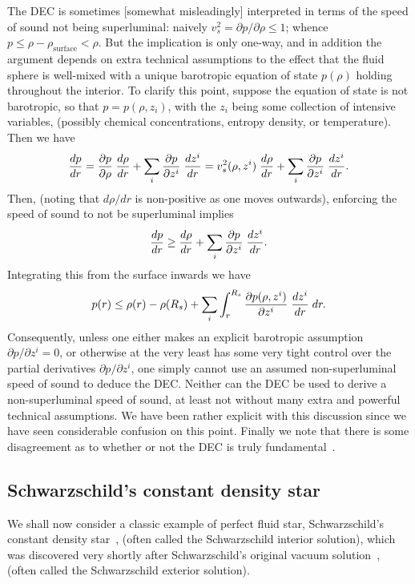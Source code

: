 \documentclass[12pt]{article}
\begin{document}
The DEC is sometimes [somewhat misleadingly] interpreted in terms of the speed of sound not being superluminal: naively $v_s^2 = \partial p/\partial \rho \leq 1$; whence $p\leq \rho-\rho_\mathrm{surface} <\rho$. 
But the implication is only one-way, and in addition the argument depends on extra technical assumptions to the effect that the fluid sphere is well-mixed with a unique barotropic equation of state $p(\rho)$ holding throughout the interior. To clarify this point, suppose the equation of state is not barotropic, so that $p=p(\rho, z_i)$, with the $z_i$ being some collection of intensive variables,  (possibly chemical concentrations, entropy density, or temperature). Then we have
\begin{equation}
{dp \over dr } = {\partial p\over\partial\rho}\; {d\rho\over dr} + 
\sum_i {\partial p\over\partial z^i} \;{d z^i\over dr}
=
v_s^2(\rho,z^i)\; {d\rho\over dr} + 
\sum_i {\partial p\over\partial z^i} \;{d z^i\over dr}. 
\end{equation}
Then, (noting that $d\rho/dr$ is non-positive as one moves outwards), enforcing the speed of sound to not be superluminal implies
\begin{equation}
{dp \over dr } \geq {d\rho\over dr} + 
\sum_i {\partial p\over\partial z^i} \;{d z^i\over dr}. 
\end{equation}
Integrating this from the surface inwards we have
\begin{equation}
p(r) \leq \rho(r) - \rho(R_s)+ 
\sum_i  \int_r^{R_s} {\partial p(\rho,z^i)\over\partial z^i} \;{d z^i\over dr} \;dr.
\end{equation}
Consequently, unless one either makes an explicit barotropic assumption $\partial p/\partial z^i=0$, or otherwise at the very least has some very tight control over the partial derivatives $\partial p/\partial z^i$,
one simply cannot use an assumed non-superluminal speed of sound to deduce the DEC. 
Neither can the DEC be used to derive a non-superluminal speed of sound, at least not without many extra and powerful technical assumptions. We have been rather explicit with this discussion since we have seen considerable confusion on this point. 
Finally we note that there is some disagreement as to whether or not the DEC is truly fundamental~\cite{twilight, Visser:1997, Visser:1996, Cattoen:2006}. 


\subsection{Schwarzschild's constant density star}
We shall now consider a classic example of perfect fluid star, Schwarzschild's constant density star~\cite{Sch:Int}, (often called the Schwarzschild interior solution), which was discovered very shortly after Schwarzschild's original vacuum solution~\cite{Sch:Ext}, (often called the Schwarzschild exterior solution).  
\end{document}
